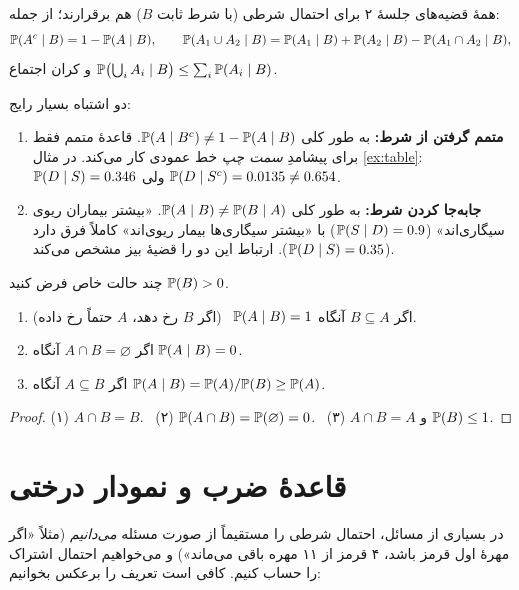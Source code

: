 \begin{corollary}[label=cor:cond-props]{}
همهٔ قضیه‌های جلسهٔ ۲ برای احتمال شرطی (با شرط ثابت $B$) هم برقرارند؛ از جمله:
\[ \P(A^c\mid B)=1-\P(A\mid B),\qquad \P(A_1\cup A_2\mid B)=\P(A_1\mid B)+\P(A_2\mid B)-\P(A_1\cap A_2\mid B), \]
و کران اجتماع $\P\bigl(\bigcup_iA_i\mid B\bigr)\le\sum_i\P(A_i\mid B)$.
\end{corollary}

\begin{warning}
دو اشتباه بسیار رایج:
\begin{enumerate}
  \item \textbf{متمم گرفتن از شرط:} به طور کلی $\P(A\mid B^c)\ne1-\P(A\mid B)$. قاعدهٔ متمم فقط برای پیشامدِ \emph{سمت چپ} خط عمودی کار می‌کند. در مثال \ref{ex:table}: $\P(D\mid S)=0.346$ ولی $\P(D\mid S^c)=0.0135\ne0.654$.
  \item \textbf{جابه‌جا کردن شرط:} به طور کلی $\P(A\mid B)\ne\P(B\mid A)$. «بیشتر بیماران ریوی سیگاری‌اند» ($\P(S\mid D)=0.9$) با «بیشتر سیگاری‌ها بیمار ریوی‌اند» کاملاً فرق دارد ($\P(D\mid S)=0.35$). ارتباط این دو را قضیهٔ بیز مشخص می‌کند.
\end{enumerate}
\end{warning}

\begin{proposition}{چند حالت خاص}
فرض کنید $\P(B)>0$.
\begin{enumerate}
  \item اگر $B\subseteq A$ آنگاه $\P(A\mid B)=1$ \ (اگر $B$ رخ دهد، $A$ حتماً رخ داده).
  \item اگر $A\cap B=\varnothing$ آنگاه $\P(A\mid B)=0$.
  \item اگر $A\subseteq B$ آنگاه $\P(A\mid B)=\P(A)/\P(B)\ge\P(A)$.
\end{enumerate}
\end{proposition}

\begin{proof}
(۱) $A\cap B=B$. \ (۲) $\P(A\cap B)=\P(\varnothing)=0$. \ (۳) $A\cap B=A$ و $\P(B)\le1$.
\end{proof}

\section{قاعدهٔ ضرب و نمودار درختی}

در بسیاری از مسائل، احتمال شرطی را مستقیماً از صورت مسئله \emph{می‌دانیم} (مثلاً «اگر مهرهٔ اول قرمز باشد، ۴ قرمز از ۱۱ مهره باقی می‌ماند») و می‌خواهیم احتمال اشتراک را حساب کنیم. کافی است تعریف را برعکس بخوانیم:

